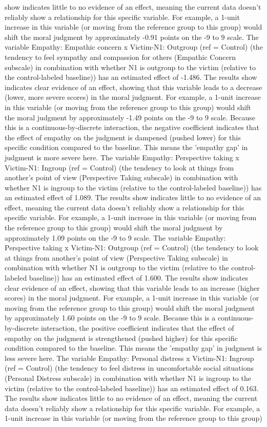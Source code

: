 \documentclass[11pt]{article}
\begin{document}
show indicates little to no evidence of an effect, meaning the current data doesn't reliably show a relationship for this specific variable. For example, a 1-unit increase in this variable (or moving from the reference group to this group) would shift the moral judgment by approximately -0.91 points on the -9 to 9 scale. The variable Empathy: Empathic concern x Victim-N1: Outgroup (ref = Control) (the tendency to feel sympathy and compassion for others (Empathic Concern subscale) in combination with whether N1 is outgroup to the victim (relative to the control-labeled baseline)) has an estimated effect of -1.486. The results show indicates clear evidence of an effect, showing that this variable leads to a decrease (lower, more severe scores) in the moral judgment. For example, a 1-unit increase in this variable (or moving from the reference group to this group) would shift the moral judgment by approximately -1.49 points on the -9 to 9 scale. Because this is a continuous-by-discrete interaction, the negative coefficient indicates that the effect of empathy on the judgment is dampened (pushed lower) for this specific condition compared to the baseline. This means the 'empathy gap' in judgment is more severe here. The variable Empathy: Perspective taking x Victim-N1: Ingroup (ref = Control) (the tendency to look at things from another's point of view (Perspective Taking subscale) in combination with whether N1 is ingroup to the victim (relative to the control-labeled baseline)) has an estimated effect of 1.089. The results show indicates little to no evidence of an effect, meaning the current data doesn't reliably show a relationship for this specific variable. For example, a 1-unit increase in this variable (or moving from the reference group to this group) would shift the moral judgment by approximately 1.09 points on the -9 to 9 scale. The variable Empathy: Perspective taking x Victim-N1: Outgroup (ref = Control) (the tendency to look at things from another's point of view (Perspective Taking subscale) in combination with whether N1 is outgroup to the victim (relative to the control-labeled baseline)) has an estimated effect of 1.600. The results show indicates clear evidence of an effect, showing that this variable leads to an increase (higher scores) in the moral judgment. For example, a 1-unit increase in this variable (or moving from the reference group to this group) would shift the moral judgment by approximately 1.60 points on the -9 to 9 scale. Because this is a continuous-by-discrete interaction, the positive coefficient indicates that the effect of empathy on the judgment is strengthened (pushed higher) for this specific condition compared to the baseline. This means the 'empathy gap' in judgment is less severe here. The variable Empathy: Personal distress x Victim-N1: Ingroup (ref = Control) (the tendency to feel distress in uncomfortable social situations (Personal Distress subscale) in combination with whether N1 is ingroup to the victim (relative to the control-labeled baseline)) has an estimated effect of 0.163. The results show indicates little to no evidence of an effect, meaning the current data doesn't reliably show a relationship for this specific variable. For example, a 1-unit increase in this variable (or moving from the reference group to this group) 
\end{document}
